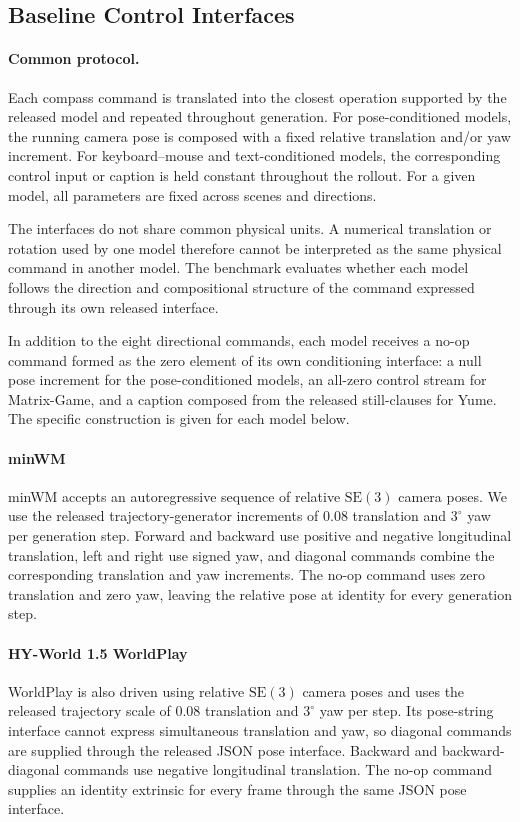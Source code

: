 \documentclass[letterpaper]{article} %
\begin{document}
\subsection{Baseline Control Interfaces}
\label{app:baseline_controls}

\paragraph{Common protocol.}
Each compass command is translated into the closest operation supported by the
released model and repeated throughout generation. For pose-conditioned
models, the running camera pose is composed with a fixed relative translation
and/or yaw increment. For keyboard--mouse and text-conditioned models, the
corresponding control input or caption is held constant throughout the
rollout. For a given model, all parameters are fixed across scenes and
directions.

The interfaces do not share common physical units. A numerical translation or
rotation used by one model therefore cannot be interpreted as the same
physical command in another model. The benchmark evaluates whether each model
follows the direction and compositional structure of the command expressed
through its own released interface.

In addition to the eight directional commands, each model receives a no-op
command formed as the zero element of its own conditioning interface: a null
pose increment for the pose-conditioned models, an all-zero control stream for
Matrix-Game, and a caption composed from the released still-clauses for Yume.
The specific construction is given for each model below.

\paragraph{minWM}
minWM accepts an autoregressive sequence of relative $\mathrm{SE}(3)$ camera
poses. We use the released trajectory-generator increments of $0.08$
translation and $3^\circ$ yaw per generation step. Forward and backward use
positive and negative longitudinal translation, left and right use signed
yaw, and diagonal commands combine the corresponding translation and yaw
increments. The no-op command uses zero translation and zero yaw, leaving the relative
pose at identity for every generation step.

\paragraph{HY-World 1.5 WorldPlay}
WorldPlay is also driven using relative $\mathrm{SE}(3)$ camera poses and uses
the released trajectory scale of $0.08$ translation and $3^\circ$ yaw per
step. Its pose-string interface cannot express simultaneous translation and
yaw, so diagonal commands are supplied through the released JSON pose
interface. Backward and backward-diagonal commands use negative longitudinal
translation. The no-op command supplies an identity extrinsic for every frame through the
same JSON pose interface.
\end{document}
